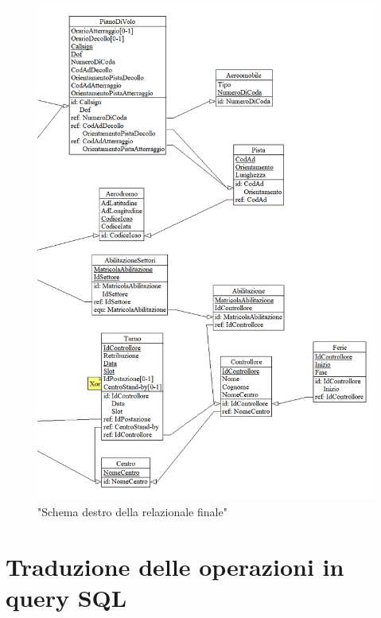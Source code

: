 \begin{figure}[H]
  \centering
  \includegraphics[width=1\textwidth]{figures/Capture2.PNG}
  \caption{"Schema destro della relazionale finale"}
\end{figure}
\section{Traduzione delle operazioni in query SQL}